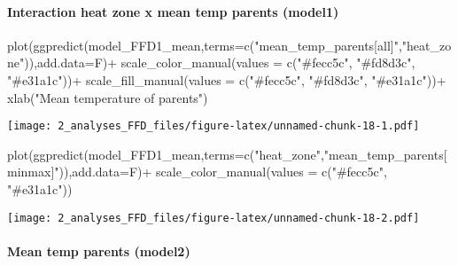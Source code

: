\documentclass[
]{article}
\newenvironment{Shaded}{\begin{snugshade}}{\end{snugshade}}
\newcommand{\AttributeTok}[1]{\textcolor[rgb]{0.77,0.63,0.00}{#1}}
\newcommand{\FunctionTok}[1]{\textcolor[rgb]{0.00,0.00,0.00}{#1}}
\newcommand{\NormalTok}[1]{#1}
\newcommand{\SpecialCharTok}[1]{\textcolor[rgb]{0.00,0.00,0.00}{#1}}
\newcommand{\StringTok}[1]{\textcolor[rgb]{0.31,0.60,0.02}{#1}}
\begin{document}
\hypertarget{interaction-heat-zone-x-mean-temp-parents-model1}{%
\paragraph{Interaction heat zone x mean temp parents
(model1)}\label{interaction-heat-zone-x-mean-temp-parents-model1}}

\begin{Shaded}
\begin{Highlighting}[]
\FunctionTok{plot}\NormalTok{(}\FunctionTok{ggpredict}\NormalTok{(model\_FFD1\_mean,}\AttributeTok{terms=}\FunctionTok{c}\NormalTok{(}\StringTok{"mean\_temp\_parents[all]"}\NormalTok{,}\StringTok{"heat\_zone"}\NormalTok{)),}\AttributeTok{add.data=}\NormalTok{F)}\SpecialCharTok{+}
  \FunctionTok{scale\_color\_manual}\NormalTok{(}\AttributeTok{values =} \FunctionTok{c}\NormalTok{(}\StringTok{"\#fecc5c"}\NormalTok{, }\StringTok{"\#fd8d3c"}\NormalTok{, }\StringTok{"\#e31a1c"}\NormalTok{))}\SpecialCharTok{+}
  \FunctionTok{scale\_fill\_manual}\NormalTok{(}\AttributeTok{values =} \FunctionTok{c}\NormalTok{(}\StringTok{"\#fecc5c"}\NormalTok{, }\StringTok{"\#fd8d3c"}\NormalTok{, }\StringTok{"\#e31a1c"}\NormalTok{))}\SpecialCharTok{+}
  \FunctionTok{xlab}\NormalTok{(}\StringTok{"Mean temperature of parents"}\NormalTok{)}
\end{Highlighting}
\end{Shaded}

\texttt{[image: 2\_analyses\_FFD\_files/figure-latex/unnamed-chunk-18-1.pdf]}

\begin{Shaded}
\begin{Highlighting}[]
\FunctionTok{plot}\NormalTok{(}\FunctionTok{ggpredict}\NormalTok{(model\_FFD1\_mean,}\AttributeTok{terms=}\FunctionTok{c}\NormalTok{(}\StringTok{"heat\_zone"}\NormalTok{,}\StringTok{"mean\_temp\_parents[minmax]"}\NormalTok{)),}\AttributeTok{add.data=}\NormalTok{F)}\SpecialCharTok{+}
  \FunctionTok{scale\_color\_manual}\NormalTok{(}\AttributeTok{values =} \FunctionTok{c}\NormalTok{(}\StringTok{"\#fecc5c"}\NormalTok{, }\StringTok{"\#e31a1c"}\NormalTok{))}
\end{Highlighting}
\end{Shaded}

\texttt{[image: 2\_analyses\_FFD\_files/figure-latex/unnamed-chunk-18-2.pdf]}

\hypertarget{mean-temp-parents-model2}{%
\paragraph{Mean temp parents (model2)}\label{mean-temp-parents-model2}}
\end{document}
